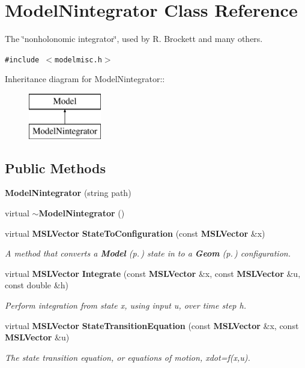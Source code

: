 \section{Model\-Nintegrator  Class Reference}
\label{class_ModelNintegrator}
The \char`\"{}nonholonomic integrator\char`\"{}, used by R. Brockett and many others. 


{\tt \#include $<$modelmisc.h$>$}

Inheritance diagram for Model\-Nintegrator::\begin{figure}[H]
\begin{center}
\leavevmode
\includegraphics[height=2cm]{class_ModelNintegrator}
\end{center}
\end{figure}
\subsection*{Public Methods}
\begin{CompactItemize}
\item 
{\bf Model\-Nintegrator} (string path)
\item 
virtual {\bf $\sim$Model\-Nintegrator} ()
\item 
virtual {\bf MSLVector} {\bf State\-To\-Configuration} (const {\bf MSLVector} \&x)
\begin{CompactList}\small\item\em A method that converts a {\bf Model} {\rm (p.\,\pageref{class_Model})} state in to a {\bf Geom} {\rm (p.\,\pageref{class_Geom})} configuration.\item\end{CompactList}\item 
virtual {\bf MSLVector} {\bf Integrate} (const {\bf MSLVector} \&x, const {\bf MSLVector} \&u, const double \&h)
\begin{CompactList}\small\item\em Perform integration from state x, using input u, over time step h.\item\end{CompactList}\item 
virtual {\bf MSLVector} {\bf State\-Transition\-Equation} (const {\bf MSLVector} \&x, const {\bf MSLVector} \&u)
\begin{CompactList}\small\item\em The state transition equation, or equations of motion, xdot=f(x,u).\item\end{CompactList}\end{CompactItemize}
